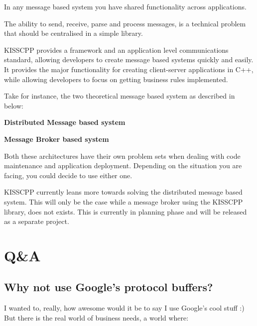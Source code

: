 In any message based system you have shared functionality across applications.

The ability to send, receive, parse and process messages, is a technical problem that should be centralised in a simple library.

K\-I\-S\-S\-C\-P\-P provides a framework and an application level communications standard, allowing developers to create message based systems quickly and easily. It provides the major functionality for creating client-\/server applications in C++, while allowing developers to focus on getting business rules implemented.

Take for instance, the two theoretical message based system as described in below\-:


\begin{DoxyEnumerate}
\item {\bfseries Distributed Message based system} 
\item {\bfseries Message Broker based system} 
\end{DoxyEnumerate}

Both these architectures have their own problem sets when dealing with code maintenance and application deployment. Depending on the situation you are facing, you could decide to use either one.

K\-I\-S\-S\-C\-P\-P currently leans more towards solving the distributed message based system. This will only be the case while a message broker using the K\-I\-S\-S\-C\-P\-P library, does not exists. This is currently in planning phase and will be released as a separate project.

\section*{Q\&A}

\subsection*{Why not use Google's protocol buffers?}

I wanted to, really, how awesome would it be to say I use Google's cool stuff \-:) But there is the real world of business needs, a world where\-:


